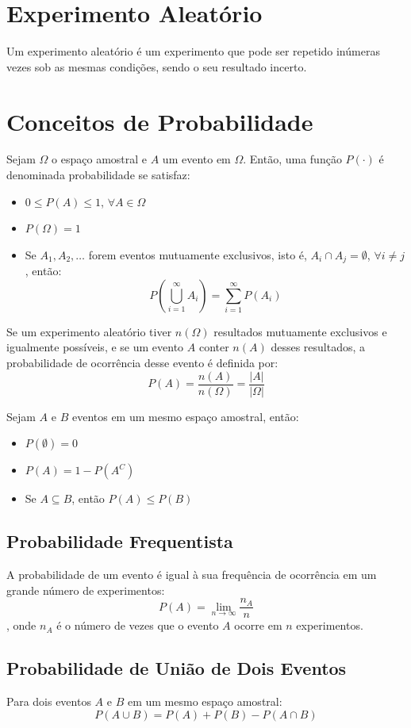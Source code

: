 \documentclass{article}
\begin{document}
\section{Experimento Aleatório}
Um experimento aleatório é um experimento que pode ser repetido inúmeras vezes sob as mesmas condições, sendo o seu resultado incerto.

\section{Conceitos de Probabilidade}
Sejam $\Omega$ o espaço amostral e $A$ um evento em $\Omega$. Então, uma função $P(\cdot)$ é denominada probabilidade se satisfaz:
\begin{itemize}
    \item $0 \leq P(A) \leq 1$, $\forall A \in \Omega$ 
    \item $P(\Omega) = 1$
    \item Se $A_1, A_2, \dots$ forem eventos mutuamente exclusivos, isto é, $A_i \cap A_j = \emptyset$, $\forall i \neq j$, então:
    $$
    P\left( \bigcup_{i=1}^{\infty} A_i \right) = \sum_{i=1}^{\infty} P(A_i)
    $$
\end{itemize}

Se um experimento aleatório tiver $n(\Omega)$ resultados mutuamente exclusivos e igualmente possíveis, e se um evento $A$ conter $n(A)$ desses resultados, a probabilidade de ocorrência desse evento é definida por:
    $$
    P(A) = \frac{n(A)}{n(\Omega)} = \frac{|A|}{|\Omega|}
    $$

Sejam $A$ e $B$ eventos em um mesmo espaço amostral, então:

\begin{itemize}
  \item $P(\emptyset) = 0$
  \item $P(A) = 1 - P(A^C)$
  \item Se $A \subseteq B$, então $P(A) \leq P(B)$
\end{itemize}

\subsection{Probabilidade Frequentista}
A probabilidade de um evento é igual à sua frequência de ocorrência em um grande número de experimentos:
    $$
    P(A) = \lim_{n \to \infty} \frac{n_A}{n}
    $$,
onde $n_A$ é o número de vezes que o evento $A$ ocorre em $n$ experimentos.

\subsection{Probabilidade de União de Dois Eventos}
Para dois eventos $A$ e $B$ em um mesmo espaço amostral:
    $$
    P(A \cup B) = P(A) + P(B) - P(A \cap B)
    $$
\end{document}

